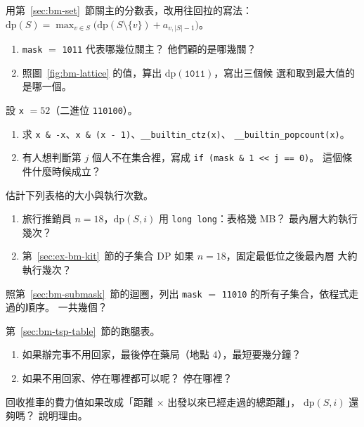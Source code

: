 \begin{drills}[label=drills:bm]
\item 用第~\ref{sec:bm-set}~節關主的分數表，改用往回拉的寫法：
$\mathrm{dp}(S) = \max_{v \in S} \bigl(\mathrm{dp}(S \setminus \{v\}) + a_{v,|S|-1}\bigr)$。
\begin{enumerate}
\item \texttt{mask} $=$ \texttt{1011} 代表哪幾位關主？ 他們顧的是哪幾關？
\item 照圖~\ref{fig:bm-lattice} 的值，算出 $\mathrm{dp}(\texttt{1011})$，寫出三個候
選和取到最大值的是哪一個。
\end{enumerate}

\item 設 \texttt{x} $= 52$（二進位 \texttt{110100}）。
\begin{enumerate}
\item 求 \texttt{x \& -x}、\texttt{x \& (x - 1)}、\texttt{\_\_builtin\_ctz(x)}、
\texttt{\_\_builtin\_popcount(x)}。
\item 有人想判斷第 $j$ 個人不在集合裡，寫成 \texttt{if (mask \& 1 << j == 0)}。
這個條件什麼時候成立？
\end{enumerate}

\item 估計下列表格的大小與執行次數。
\begin{enumerate}
\item 旅行推銷員 $n = 18$，$\mathrm{dp}(S, i)$ 用 \texttt{long long}：表格幾
MB？ 最內層大約執行幾次？
\item 第~\ref{sec:ex-bm-kit}~節的子集合 DP 如果 $n = 18$，固定最低位之後最內層
大約執行幾次？
\end{enumerate}

\item 照第~\ref{sec:bm-submask}~節的迴圈，列出 \texttt{mask} $=$ \texttt{11010}
的所有子集合，依程式走過的順序。 一共幾個？

\item 第~\ref{sec:bm-tsp-table}~節的跑腿表。
\begin{enumerate}
\item 如果辦完事不用回家，最後停在藥局（地點 $4$），最短要幾分鐘？
\item 如果不用回家、停在哪裡都可以呢？ 停在哪裡？
\end{enumerate}

\item 回收推車的費力值如果改成「距離 $\times$ 出發以來已經走過的總距離」，
$\mathrm{dp}(S, i)$ 還夠嗎？ 說明理由。


\end{drills}
